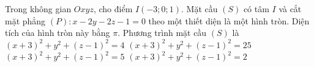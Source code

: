 \begin{ex}%
	Trong không gian $Oxyz$, cho điểm $I(-3;0;1)$. Mặt cầu $(S)$ có tâm $I$ và cắt mặt phẳng $(P)\colon x-2y-2z-1=0$ theo một thiết diện là một hình tròn. Diện tích của hình tròn này bằng $\pi$. Phương trình mặt cầu $(S)$ là
	\choice
	{$(x+3)^2+y^2+(z-1)^2=4$}
	{$(x+3)^2+y^2+(z-1)^2=25$}
	{\True $(x+3)^2+y^2+(z-1)^2=5$}
	{$(x+3)^2+y^2+(z-1)^2=2$}
\end{ex}

